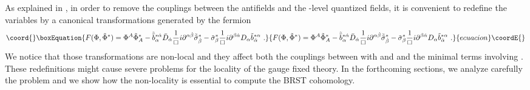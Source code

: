 \documentclass[a4paper,12pt]{article}
\begin{document}
As explained in \cite{GPZ}, in order to remove the couplings between
the antifields \coordHE{} and the \coordHE{}-level quantized
fields, it is convenient to redefine the variables by a canonical
transformations generated by the fermion
\begin{equation}\coord{}\boxEquation{
F(\Phi , \tilde\Phi^*) =\Phi^A \tilde\Phi^*_A -
\tilde{\bar b}{}^{*\dot \alpha}_\alpha \bar D_{\dot \alpha}\frac{1}{\Box}
i\partial^{\alpha\dot \beta}\tilde{\bar \sigma}^*_{\dot \beta}-
\tilde{\sigma}^*_{ \beta}\frac{1}{\Box}
i\partial^{\beta\dot\alpha} D_ \alpha\tilde{ b}^{* \alpha}_{\dot\alpha}\ .
\label{Fdiagsigma}
}{
F(\Phi , \tilde\Phi^*) =\Phi^A \tilde\Phi^*_A -
\tilde{\bar b}{}^{*\dot \alpha}_\alpha \bar D_{\dot \alpha}\frac{1}{\Box}
i\partial^{\alpha\dot \beta}\tilde{\bar \sigma}^*_{\dot \beta}-
\tilde{\sigma}^*_{ \beta}\frac{1}{\Box}
i\partial^{\beta\dot\alpha} D_ \alpha\tilde{ b}^{* \alpha}_{\dot\alpha}\ .
}{ecuacion}\coordE{}\end{equation}
We notice that those transformations are non-local and they affect
both the couplings between \coordHE{} with \myHighlight{$\sigma$}\coordHE{} and \myHighlight{$\bar
\sigma$}\coordHE{} and the minimal terms involving \myHighlight{$\sigma^*, \bar \sigma^*$}\coordHE{}.
These redefinitions might cause severe problems for the locality of
the gauge fixed theory. In the forthcoming sections, we analyze
carefully the problem and we show how the non-locality is essential to
compute the BRST cohomology.
\end{document}
